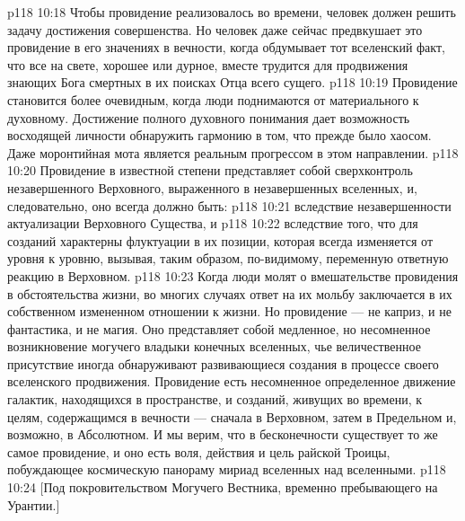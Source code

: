 \vs p118 10:18 Чтобы провидение реализовалось во времени, человек должен решить задачу достижения совершенства. Но человек даже сейчас предвкушает это провидение в его значениях в вечности, когда обдумывает тот вселенский факт, что все на свете, хорошее или дурное, вместе трудится для продвижения знающих Бога смертных в их поисках Отца всего сущего.
\vs p118 10:19 \pc Провидение становится более очевидным, когда люди поднимаются от материального к духовному. Достижение полного духовного понимания дает возможность восходящей личности обнаружить гармонию в том, что прежде было хаосом. Даже моронтийная мота является реальным прогрессом в этом направлении.
\vs p118 10:20 Провидение в известной степени представляет собой сверхконтроль незавершенного Верховного, выраженного в незавершенных вселенных, и, следовательно, оно всегда должно быть:
\vs p118 10:21 \bibnobreakspace {} вследствие незавершенности актуализации Верховного Существа, и
\vs p118 10:22 \bibnobreakspace {} вследствие того, что для созданий характерны флуктуации в их позиции, которая всегда изменяется от уровня к уровню, вызывая, таким образом, по\hyp{}видимому, переменную ответную реакцию в Верховном.
\vs p118 10:23 \pc Когда люди молят о вмешательстве провидения в обстоятельства жизни, во многих случаях ответ на их мольбу заключается в их собственном измененном отношении к жизни. Но провидение --- не каприз, и не фантастика, и не магия. Оно представляет собой медленное, но несомненное возникновение могучего владыки конечных вселенных, чье величественное присутствие иногда обнаруживают развивающиеся создания в процессе своего вселенского продвижения. Провидение есть несомненное определенное движение галактик, находящихся в пространстве, и созданий, живущих во времени, к целям, содержащимся в вечности --- сначала в Верховном, затем в Предельном и, возможно, в Абсолютном. И мы верим, что в бесконечности существует то же самое провидение, и оно есть воля, действия и цель райской Троицы, побуждающее космическую панораму мириад вселенных над вселенными.
\vsetoff
\vs p118 10:24 [Под покровительством Могучего Вестника, временно пребывающего на Урантии.]
